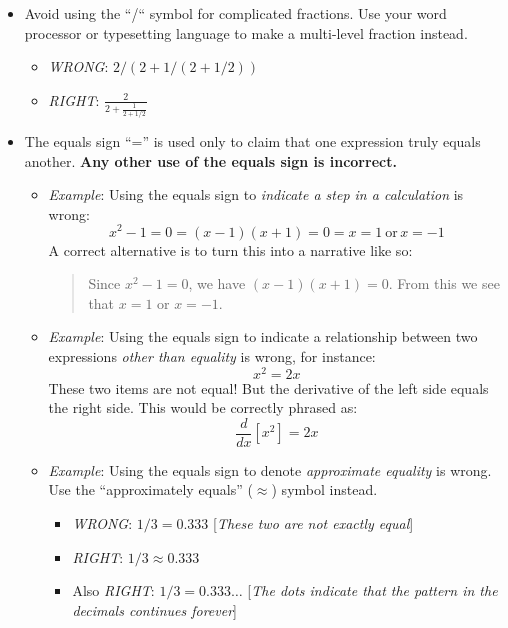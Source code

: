 \documentclass[11pt]{article}
\begin{document}
\begin{itemize}
	\item Avoid using the “/“ symbol for complicated fractions. Use your word processor or typesetting language to make a multi-level fraction instead. 
	\begin{itemize}
		\item \emph{WRONG}: $2/(2 + 1/(2 + 1/2))$
		\item \emph{RIGHT}: $\frac{2}{2 + \frac{1}{2 + 1/2}}$
	\end{itemize}
	
	\item The equals sign ``='' is used only to claim that one expression truly equals another. \textbf{Any other use of the equals sign is incorrect.} 
	\begin{itemize}
		\item \emph{Example}: Using the equals sign to \emph{indicate a step in a calculation} is wrong: 
		\[ x^2 - 1 = 0 = (x-1)(x+1) = 0 = x = 1 \ \text{or} \, x = -1\]
		A correct alternative is to turn this into a narrative like so: 
		\begin{quote}
			Since $x^2 - 1 = 0$, we have $(x-1)(x+1) = 0$. From this we see that $x=1$ or $x = -1$.
		\end{quote}
		
		\item \emph{Example}: Using the equals sign to indicate a relationship between two expressions \emph{other than equality} is wrong, for instance: 
		\[ x^2 = 2x \]
		These two items are not equal! But the derivative of the left side equals the right side. This would be correctly phrased as: 
		\[ \frac{d}{dx}[x^2] = 2x \]
		
		\item \emph{Example}: Using the equals sign to denote \emph{approximate equality} is wrong. Use the ``approximately equals'' ($\approx$) symbol instead. 
			\begin{itemize}
				\item \emph{WRONG}: $1/3 = 0.333$  [\emph{These two are not exactly equal}]
				\item \emph{RIGHT}: $1/3 \approx 0.333$ 
				\item Also \emph{RIGHT}: $1/3 = 0.333\dots$ [\emph{The dots indicate that the pattern in the decimals continues forever}]
			\end{itemize}
		
	\end{itemize}
	

\end{itemize}
\end{document}
